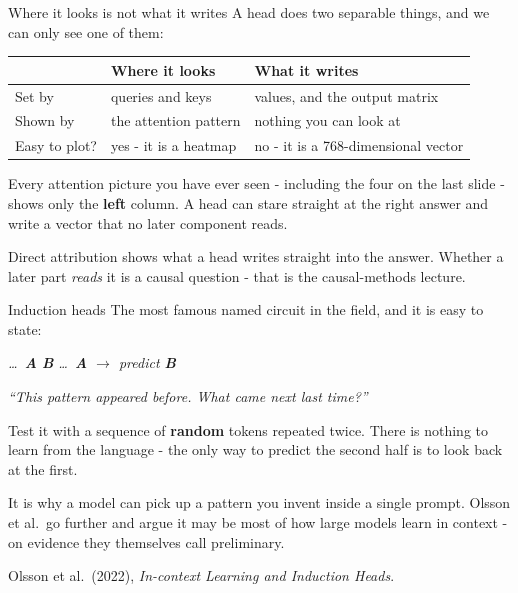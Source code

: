 \documentclass[aspectratio=169]{beamer}
\newcommand{\keybox}[1]{%
  \begin{tcolorbox}[colback=armblue!8, colframe=armblue, boxrule=0.6pt, arc=2pt]
  #1
  \end{tcolorbox}}
\newcommand{\trapbox}[1]{%
  \begin{tcolorbox}[colback=armred!8, colframe=armred, boxrule=0.6pt, arc=2pt]
  #1
  \end{tcolorbox}}
\newcommand{\promptbox}[1]{%
  \begin{center}
  \begin{tcolorbox}[colback=lightbg, colframe=gray, boxrule=0.5pt, arc=2pt, width=0.96\textwidth]
    \centering\textit{#1}
  \end{tcolorbox}
  \end{center}}
\begin{document}
\begin{frame}{Where it looks is not what it writes}
  \vspace{0.5em}
  A head does two separable things, and we can only see one of them:

  \vspace{0.7em}
  \begin{center}
  \small
  \begin{tabular}{@{}>{\raggedright\arraybackslash}p{}>{\raggedright\arraybackslash}p{}>{\raggedright\arraybackslash}p{}@{}}
    \toprule
    & \textbf{Where it looks} & \textbf{What it writes}\\
    \midrule
    Set by & queries and keys & values, and the output matrix\\[0.3em]
    Shown by & the attention pattern & \textcolor{armred}{nothing you can look at}\\[0.3em]
    Easy to plot? & yes - it is a heatmap & no - it is a 768-dimensional vector\\
    \bottomrule
  \end{tabular}
  \end{center}

  \vspace{0.6em}
  \trapbox{\small Every attention picture you have ever seen - including the four on the last
  slide - shows only the \textbf{left} column. A head can stare straight at the right answer and
  write a vector that no later component reads.}

  \vspace{0.4em}
  {\small Direct attribution shows what a head writes straight into the answer. Whether a later
  part \emph{reads} it is a causal question - that is the causal-methods lecture.}
\end{frame}

\begin{frame}{Induction heads}
  \vspace{0.5em}
  The most famous named circuit in the field, and it is easy to state:

  \vspace{0.6em}
  \promptbox{\ldots\ \textbf{A} \textbf{B} \ldots\ \textbf{A} $\rightarrow$ predict \textbf{B}}

  \vspace{0.3em}
  \emph{``This pattern appeared before. What came next last time?''}

  \vspace{0.7em}
  Test it with a sequence of \textbf{random} tokens repeated twice. There is nothing to learn
  from the language - the only way to predict the second half is to look back at the first.

  \vspace{0.7em}
  \keybox{It is why a model can pick up a pattern you invent inside a single prompt. Olsson et
  al.\ go further and argue it may be most of how large models learn in context - on evidence
  they themselves call preliminary.}

  \vspace{0.4em}
  {\footnotesize Olsson et al.\ (2022), \emph{In-context Learning and Induction Heads}.}
\end{frame}
\end{document}
